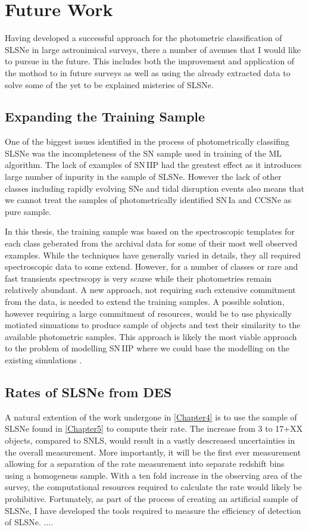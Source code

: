 \section{Future Work}
Having developed a successful approach for the photometric classification of SLSNe in large astronimical surveys, there a number of avenues that I would like to pursue in the future. This includes both the improvement and application of the mothod to in future surveys as well as using the already extracted data to solve some of the yet to be explained misteries of SLSNe.

\subsection{Expanding the Training Sample}
One of the biggest issues identified in the process of photometrically classifing SLSNe was the incompleteness of the SN sample used in training of the ML algorithm. The lack of examples of SN\,IIP had the greatest effect as it introduces large number of inpurity in the sample of SLSNe. However the lack of other classes including rapidly evolving SNe and tidal disruption events also means that we cannot treat the samples of photometrically identified SN\,Ia and CCSNe as pure sample.

In this thesis, the training sample was based on the spectroscopic templates for each class geberated from the archival data for some of their most well observed examples. While the techniques have generally varied in details, they all required spectroscopic data to some extend. However, for a number of classes or rare and fast transients spectrscopy is very scarse while their photometries remain relatively abundant. A new approach, not requiring such extensive commitment from the data, is needed to extend the training samples. A possible solution, however requiring a large commitment of resources, would be to use physically motiated simuations to produce sample of objects and test their similarity to the available photometric samples. This approach is likely the most viable approach to the problem of modelling SN\,IIP where we could base the modelling on the existing simulations \citep{Dessart2013,Dessart2016}.

\subsection{Rates of SLSNe from DES}
A natural extention of the work undergone in \cref{Chapter4} is to use the sample of SLSNe found in \cref{Chapter5} to compute their rate. The increase from 3 to 17+XX objects, compared to SNLS, would result in a vastly descreased uncertainties in the overall measurement. More importantly, it will be the first ever measurement allowing for a separation of the rate measurement into separate redshift bins using a homogeneus sample. With a ten fold increase in the observing area of the survey, the computational resources required to calculate the rate would likely be prohibitive. Fortunately, as part of the process of creating an artificial sample of SLSNe, I have developed the tools required to measure the efficiency of detection of SLSNe. ....


